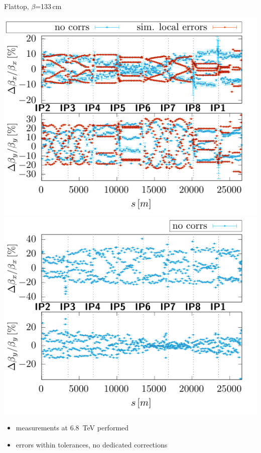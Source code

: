 \documentclass[4pt,usenames,dvipsnames,aspectratio=169,table]{beamer}
\begin{document}
\begin{frame}{Flattop, $\beta$=133\,cm}
    
    \includegraphics[width=0.49\linewidth]{images/flattop/b1_bb.pdf}
    \hfill
    \includegraphics[width=0.49\linewidth]{images/flattop/b2_bb.pdf}
    \begin{itemize}
        \item measurements at \SI{6.8}{TeV} performed
        \item errors within tolerances, no dedicated corrections
    \end{itemize}
    
\end{frame}
\end{document}

